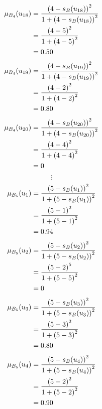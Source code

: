 \documentclass[a4paper,openany]{book}
\begin{document}
				\begin{align}
					\mu_{B_4}(u_{18}) &= \frac{\left(4-s_B(u_{18})\right)^2}{1 + \left(4-s_B(u_{18})\right)^2}\\
					&= \frac{\left(4-5\right)^2}{1 + \left(4-5\right)^2} \notag \\
					&= 0.50 \notag
				\end{align}
				\begin{align}
					\mu_{B_4}(u_{19}) &= \frac{\left(4-s_B(u_{19})\right)^2}{1 + \left(4-s_B(u_{19})\right)^2}\\
					&= \frac{\left(4-2\right)^2}{1 + \left(4-2\right)^2} \notag \\
					&= 0.80 \notag
				\end{align}
				\begin{align}
					\mu_{B_4}(u_{20}) &= \frac{\left(4-s_B(u_{20})\right)^2}{1 + \left(4-s_B(u_{20})\right)^2}\\
					&= \frac{\left(4-4\right)^2}{1 + \left(4-4\right)^2} \notag \\
					&= 0 \notag
				\end{align}
				\[
					\vdots
				\]
				\begin{align}
					\mu_{B_5}(u_1) &= \frac{\left(5-s_B(u_1)\right)^2}{1 + \left(5-s_B(u_1)\right)^2}\\
					&= \frac{\left(5-1\right)^2}{1 + \left(5-1\right)^2} \notag \\
					&= 0.94 \notag
				\end{align}
				\begin{align}
					\mu_{B_5}(u_2) &= \frac{\left(5-s_B(u_2)\right)^2}{1 + \left(5-s_B(u_2)\right)^2}\\
					&= \frac{\left(5-2\right)^5}{1 + \left(5-5\right)^2} \notag \\
					&= 0 \notag
				\end{align}
				\begin{align}
					\mu_{B_5}(u_3) &= \frac{\left(5-s_B(u_3)\right)^2}{1 + \left(5-s_B(u_3)\right)^2}\\
					&= \frac{\left(5-3\right)^2}{1 + \left(5-3\right)^2} \notag \\
					&= 0.80 \notag
				\end{align}
				\begin{align}
					\mu_{B_5}(u_4) &= \frac{\left(5-s_B(u_4)\right)^2}{1 + \left(5-s_B(u_4)\right)^2}\\
					&= \frac{\left(5-2\right)^2}{1 + \left(5-2\right)^2} \notag \\
					&= 0.90 \notag
				\end{align}
\end{document}
